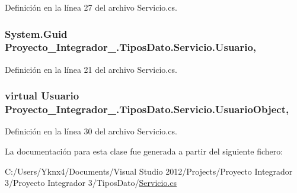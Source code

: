 Definición en la línea 27 del archivo Servicio.\-cs.

\hypertarget{class_proyecto___integrador__3_1_1_tipos_dato_1_1_servicio_a9321964b41ee188556767aabeecfc737}{
\subsubsection[{Usuario}]{\setlength{\rightskip}{0pt plus 5cm}System.\-Guid Proyecto\-\_\-\-Integrador\-\_.\-Tipos\-Dato.\-Servicio.\-Usuario\hspace{0.3cm}{\ttfamily [get]}, {\ttfamily [set]}}}\label{class_proyecto___integrador__3_1_1_tipos_dato_1_1_servicio_a9321964b41ee188556767aabeecfc737}


Definición en la línea 21 del archivo Servicio.\-cs.

\hypertarget{class_proyecto___integrador__3_1_1_tipos_dato_1_1_servicio_addfdec1cd1f2629003b19752e0e0020b}{
\subsubsection[{Usuario\-Object}]{\setlength{\rightskip}{0pt plus 5cm}virtual {\bf Usuario} Proyecto\-\_\-\-Integrador\-\_.\-Tipos\-Dato.\-Servicio.\-Usuario\-Object\hspace{0.3cm}{\ttfamily [get]}, {\ttfamily [set]}}}\label{class_proyecto___integrador__3_1_1_tipos_dato_1_1_servicio_addfdec1cd1f2629003b19752e0e0020b}


Definición en la línea 30 del archivo Servicio.\-cs.



La documentación para esta clase fue generada a partir del siguiente fichero\-:\begin{DoxyCompactItemize}
\item 
C\-:/\-Users/\-Yknx4/\-Documents/\-Visual Studio 2012/\-Projects/\-Proyecto Integrador 3/\-Proyecto Integrador 3/\-Tipos\-Dato/\hyperlink{_servicio_8cs}{Servicio.\-cs}\end{DoxyCompactItemize}
